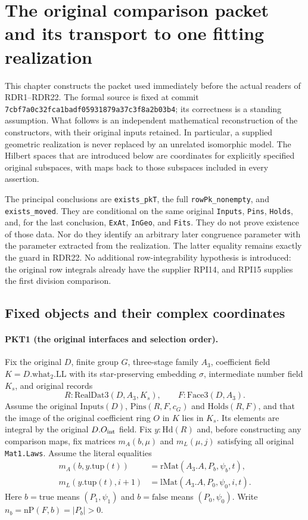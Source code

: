 \section{The original comparison packet and its transport to one fitting realization}
\label{sec:comparison-packet}

This chapter constructs the packet used immediately before the actual readers of
RDR1--RDR22.  The formal source is fixed at commit
\texttt{7cbf7a0c32fca1badf05931879a37c3f8a2b03b4}; its correctness is a standing
assumption.  What follows is an independent mathematical reconstruction of the
constructors, with their original inputs retained.  In particular, a supplied
geometric realization is never replaced by an unrelated isomorphic model.
The Hilbert spaces that are introduced below are coordinates for explicitly
specified original subspaces, with maps back to those subspaces included in
every assertion.

The principal conclusions are \texttt{exists\_pkT}, the full
\texttt{rowPk\_nonempty}, and \texttt{exists\_moved}.  They are conditional on
the same original \texttt{Inputs}, \texttt{Pins}, \texttt{Holds}, and, for the
last conclusion, \texttt{ExAt}, \texttt{InGeo}, and \texttt{Fits}.
They do not prove existence of those data.  Nor do they identify an arbitrary
later congruence parameter with the parameter extracted from the realization.
The latter equality remains exactly the guard in RDR22.  No additional
row-integrability hypothesis is introduced: the original row integrals already
have the supplier RPI14, and RPI15 supplies the first division comparison.

\subsection{Fixed objects and their complex coordinates}

\paragraph{PKT1 (the original interfaces and selection order).}\label{claim:PKT1}
Fix the original $D$, finite group $G$, three-stage family $A_3$, coefficient
field $K=D.\mathrm{what}_2.\mathrm{LL}$ with its star-preserving embedding $\sigma$, intermediate
number field $K_s$, and original records
\[
 R:\mathrm{RealDat3}(D,A_3,K_s),\qquad F:\mathrm{Face3}(D,A_3).
\]
Assume the original $\mathrm{Inputs}(D)$, $\mathrm{Pins}(R,F,c_G)$ and
$\mathrm{Holds}(R,F)$, and that the image of the original coefficient ring
$O$ in $K$ lies in $K_s$.  Its elements are integral by the original $D.O_{\rm int}$ field.  Fix $y:\mathrm{Hd}(R)$ and, before constructing
any comparison maps, fix matrices $m_A(b,\mu)$ and $m_L(\mu,j)$ satisfying
all original \texttt{Mat1.Laws}.  Assume the literal equalities
\[
\begin{split}
 m_A(b,y.\mathrm{tup}(t))&=\mathrm{rMat}(A_3.A,P_b,\psi_b,t),\\
 m_L(y.\mathrm{tup}(t),i+1)&=\mathrm{lMat}(A_3.A,P_0,\psi_0,i,t).
\end{split}\tag{PKT.1}
\]
Here $b=\mathrm{true}$ means $(P_1,\psi_1)$ and $b=\mathrm{false}$ means
$(P_0,\psi_0)$.  Write $n_b=\mathrm{nP}(F,b)=|P_b|>0$.

